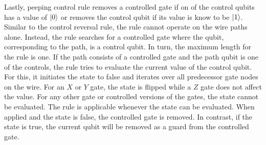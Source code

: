 Lastly, peeping control rule removes a controlled gate if on of the control qubits has a value of $\ket{0}$ or removes the control qubit if its value is know to be $\ket{1}$. Similar to the control reversal rule, the rule cannot operate on the wire paths alone. Instead, the rule searches for a controlled gate where the qubit, corresponding to the path, is a control qubit. In turn, the maximum length for the rule is one. If the path consists of a controlled gate and the path qubit is one of the controls, the rule tries to evaluate the current value of the control qubit. For this, it initiates the state to false and iterates over all predecessor gate nodes on the wire. For an $X$ or $Y$ gate, the state is flipped while a $Z$ gate does not affect the value. For any other gate or controlled versions of the gates, the state cannot be evaluated. The rule is applicable whenever the state can be evaluated. When applied and the state is false, the controlled gate is removed. In contrast, if the state is true, the current qubit will be removed as a guard from the controlled gate. 
